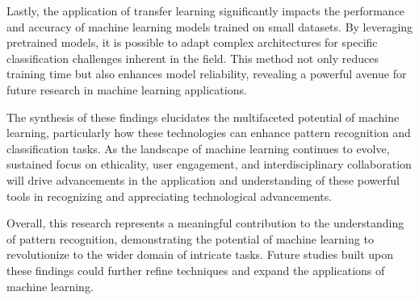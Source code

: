 Lastly, the application of transfer learning significantly impacts the performance and accuracy of machine learning models trained on small datasets. By leveraging pretrained models, it is possible to adapt complex architectures for specific classification challenges inherent in the field. This method not only reduces training time but also enhances model reliability, revealing a powerful avenue for future research in machine learning applications.

The synthesis of these findings elucidates the multifaceted potential of machine learning, particularly how these technologies can enhance pattern recognition and classification tasks. As the landscape of machine learning continues to evolve, sustained focus on ethicality, user engagement, and interdisciplinary collaboration will drive advancements in the application and understanding of these powerful tools in recognizing and appreciating technological advancements.

Overall, this research represents a meaningful contribution to the understanding of pattern recognition, demonstrating the potential of machine learning to revolutionize to the wider domain of intricate tasks. Future studies built upon these findings could further refine techniques and expand the applications of machine learning.

